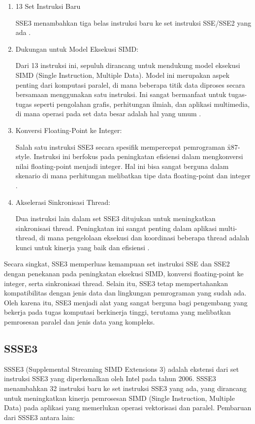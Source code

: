\begin{enumerate}
	\item 13 Set Instruksi Baru

	      SSE3 menambahkan tiga belas instruksi baru ke set instruksi SSE/SSE2 yang ada \cite{Hassaballah2008}.

	\item Dukungan untuk Model Eksekusi SIMD:

	      Dari 13 instruksi ini, sepuluh dirancang untuk mendukung model eksekusi SIMD (Single Instruction, Multiple Data). Model ini merupakan aspek penting dari komputasi paralel, di mana beberapa titik data diproses secara bersamaan menggunakan satu instruksi. Ini sangat bermanfaat untuk tugas-tugas seperti pengolahan grafis, perhitungan ilmiah, dan aplikasi multimedia, di mana operasi pada set data besar adalah hal yang umum \cite{Hassaballah2008}.

	\item Konversi Floating-Point ke Integer:

	      Salah satu instruksi SSE3 secara spesifik mempercepat pemrograman \f{x87-style}. Instruksi ini berfokus pada peningkatan efisiensi dalam mengkonversi nilai floating-point menjadi integer. Hal ini bisa sangat berguna dalam skenario di mana perhitungan melibatkan tipe data floating-point dan integer \cite{Hassaballah2008}.

	\item Akselerasi Sinkronisasi Thread:

	      Dua instruksi lain dalam set SSE3 ditujukan untuk meningkatkan sinkronisasi thread. Peningkatan ini sangat penting dalam aplikasi multi-thread, di mana pengelolaan eksekusi dan koordinasi beberapa thread adalah kunci untuk kinerja yang baik dan efisiensi \cite{Hassaballah2008}.
\end{enumerate}

Secara singkat, SSE3 memperluas kemampuan set instruksi SSE dan SSE2 dengan penekanan pada peningkatan eksekusi SIMD, konversi floating-point ke integer, serta sinkronisasi thread. Selain itu, SSE3 tetap mempertahankan kompatibilitas dengan jenis data dan lingkungan pemrograman yang sudah ada. Oleh karena itu, SSE3 menjadi alat yang sangat berguna bagi pengembang yang bekerja pada tugas komputasi berkinerja tinggi, terutama yang melibatkan pemrosesan paralel dan jenis data yang kompleks.

\subsection{SSSE3}
SSSE3 (Supplemental Streaming SIMD Extensions 3) adalah ekstensi dari set instruksi SSE3 yang diperkenalkan oleh Intel pada tahun 2006. SSSE3 menambahkan 32 instruksi baru ke set instruksi SSE3 yang ada, yang dirancang untuk meningkatkan kinerja pemrosesan SIMD (Single Instruction, Multiple Data) pada aplikasi yang memerlukan operasi vektorisasi dan paralel. Pembaruan dari SSSE3 antara lain:

